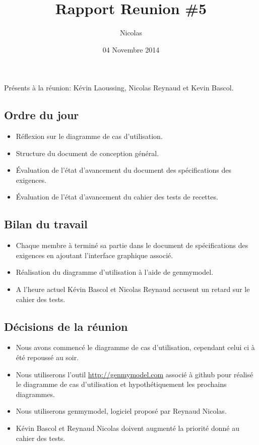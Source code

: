 \documentclass{article}
\title{Rapport Reunion \#5}
\author{Nicolas \bsc{Reynaud}}
\date{04 Novembre 2014}
\begin{document}
\maketitle
\newpage

Présents à la réunion: Kévin Laoussing, Nicolas Reynaud et Kevin Bascol.

\subsection*{Ordre du jour}
	\begin{itemize}
		\item Réflexion sur le diagramme de cas d'utilisation.
		\item Structure du document de conception général.
		\item Évaluation de l'état d'avancement du document des spécifications des exigences.
		\item Évaluation de l'état d'avancement du cahier des tests de recettes.
	\end{itemize}

\subsection*{Bilan du travail}
	\begin{itemize}
		\item Chaque membre à terminé sa partie dans le document de spécifications des exigences en ajoutant l'interface graphique associé.
		\item Réalisation du diagramme d'utilisation à l'aide de genmymodel.
		\item A l'heure actuel Kévin Bascol et Nicolas Reynaud accusent un retard sur le cahier des tests.
	\end{itemize}
	
\subsection*{Décisions de la réunion}
	\begin{itemize}
		\item Nous avons commencé le diagramme de cas d'utilisation, cependant celui ci à été repoussé au soir.
		\item Nous utiliserons l'outil \url{http://genmymodel.com} associé à github pour réalisé le diagramme de cas d'utilisation et hypothétiquement les prochains diagrammes.
		\item Nous utiliserons genmymodel, logiciel proposé par Reynaud Nicolas.
		\item Kévin Bascol et Reynaud Nicolas doivent augmenté la priorité donné au cahier des tests.
	\end{itemize}
	
\end{document}
